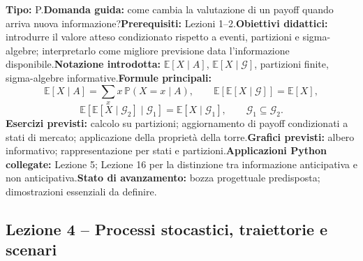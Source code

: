 \documentclass[12pt,a4paper]{article}%
\begin{document}
\textbf{Tipo:} P.\newline\textbf{Domanda guida:} come cambia la valutazione di
un payoff quando arriva nuova informazione?\newline\textbf{Prerequisiti:}
Lezioni 1--2.\newline\textbf{Obiettivi didattici:} introdurre il valore atteso
condizionato rispetto a eventi, partizioni e sigma-algebre; interpretarlo come
migliore previsione data l'informazione disponibile.\newline\textbf{Notazione
introdotta:} $\mathbb{E}[X\mid A]$, $\mathbb{E}[X\mid\mathcal{G}]$, partizioni
finite, sigma-algebre informative.\newline\textbf{Formule principali:}
\[
\mathbb{E}[X\mid A]=\sum_{x} x\,\mathbb{P}(X=x\mid A), \qquad\mathbb{E}\left[
\mathbb{E}[X\mid\mathcal{G}]\right]  =\mathbb{E}[X],
\]
\[
\mathbb{E}\left[  \mathbb{E}[X\mid\mathcal{G}_{2}]\mid\mathcal{G}_{1}\right]
=\mathbb{E}[X\mid\mathcal{G}_{1}], \qquad\mathcal{G}_{1}\subseteq
\mathcal{G}_{2}.
\]
\textbf{Esercizi previsti:} calcolo su partizioni; aggiornamento di payoff
condizionati a stati di mercato; applicazione della propriet\`{a} della
torre.\newline\textbf{Grafici previsti:} albero informativo; rappresentazione
per stati e partizioni.\newline\textbf{Applicazioni Python collegate:} Lezione
5; Lezione 16 per la distinzione tra informazione anticipativa e non
anticipativa.\newline\textbf{Stato di avanzamento:} bozza progettuale
predisposta; dimostrazioni essenziali da definire.

\subsection{Lezione 4 -- Processi stocastici, traiettorie e scenari}
\end{document}
